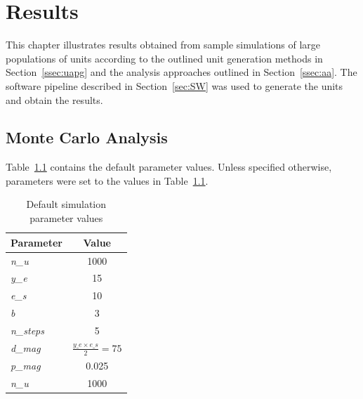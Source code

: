 \chapter{Results}
\label{chp:R}


This chapter illustrates results obtained from sample simulations of large populations of units according to the outlined unit generation methods in Section~\ref{ssec:uapg} and the analysis approaches outlined in Section~\ref{ssec:aa}. The software pipeline described in Section~\ref{sec:SW} was used to generate the units and obtain the results.

\section{Monte Carlo Analysis}

Table~\ref{tab:defpar} contains the default parameter values. Unless specified otherwise, parameters were set to the values in Table~\ref{tab:defpar}.

\begin{table}[H]
\centering
\caption{Default simulation parameter values}
\label{tab:defpar}
\begin{tabular}{@{}lc@{}}
\toprule
\multicolumn{1}{c}{\textbf{Parameter}} & \textbf{Value}                 \\ \midrule
\textit{n\_u}                          & 1000                           \\
\textit{y\_e}                          & 15                             \\
\textit{e\_s}                          & 10                             \\
\textit{b}                             & 3                              \\
\textit{n\_steps}                      & 5                              \\
\textit{d\_mag}                        & $\frac{y\_e\times e\_s}{2}=75$ \\
\textit{p\_mag}                        & 0.025                          \\
\textit{n\_u}                          & 1000                           \\ \bottomrule
\end{tabular}
\end{table}

